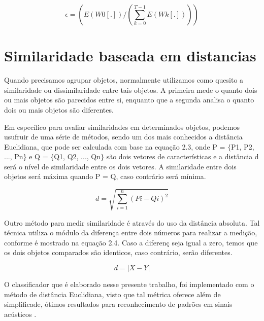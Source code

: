 \documentclass[a4paper,12pt,twoside,openright]{report}
\begin{document}
\begin{equation}
	\epsilon = (E(W0[.]) / (\sum_{k = 0}^{T-1}E(Wk[.])))
\end{equation}  
\section{Similaridade baseada em distancias}
\label{similaridade_baseada_em_distancias}

\par Quando precisamos agrupar objetos, normalmente utilizamos como quesito a similaridade ou dissimilaridade entre tais objetos. A primeira mede o quanto dois ou mais objetos s\~{a}o parecidos entre si, enquanto que a segunda analisa o quanto dois ou mais objetos s\~{a}o diferentes.

\par Em espec\'{i}fico para avaliar similaridades em determinados objetos, podemos usufruir de uma s\'{e}rie de m\'{e}todos, sendo um dos mais conhecidos a dist\^{a}ncia Euclidiana, que pode ser calculada com base na equa{\c c}\~{a}o 2.3, onde P = $\{$P1, P2, ..., Pn$\}$ e Q = $\{$Q1, Q2, ..., Qn$\}$ s\~{a}o dois vetores de caracter\'{i}sticas e a dist\^{a}ncia d ser\'{a} o n\'{i}vel de similaridade entre os dois vetores. A similaridade entre dois objetos ser\'{a} m\'{a}xima quando P = Q, caso contr\'{a}rio ser\'{a} m\'{i}nima.

\begin{equation}
	d =\sqrt{\sum_{i = 1}^{n}(Pi-Qi)^2}
\end{equation}

\vspace*{+10pt}

\par Outro m\'{e}todo para medir similaridade \'{e} atrav\'{e}s do uso da dist\^{a}ncia absoluta. Tal t\'{e}cnica utiliza o m\'{o}dulo da diferen{\c c}a entre dois n\'{u}meros para realizar a medi{\c c}\~{a}o, conforme \'{e} mostrado na equa{\c c}\~{a}o 2.4. Caso a diferen{\c c} seja igual a zero, temos que os dois objetos comparados s\~{a}o identicos, caso contr\'{a}rio, ser\~{a}o diferentes.

\begin{equation}
	d = |X - Y|
\end{equation}

\par O classificador que \'{e} elaborado nesse presente trabalho, foi implementado com o m\'{e}todo de dist\^{a}ncia Euclidiana, visto que tal m\'{e}trica oferece al\'{e}m de simplificade, \'{o}timos resultados para reconhecimento de padr\~{o}es em sinais ac\'{u}sticos \cite{Marcel_Kfouri}.
\end{document}
